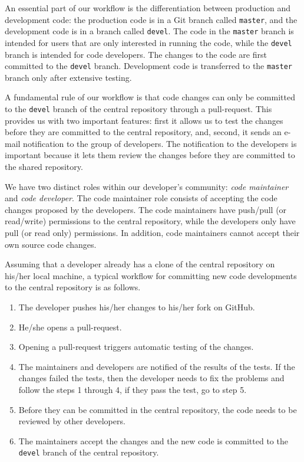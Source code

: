 An essential part of our workflow is the differentiation between production and
development code: the production code is in a Git branch called
\texttt{master}, and the
development code is in a branch called \texttt{devel}.
The code in the \texttt{master} branch is intended for users that are only
interested in
running the code, while the \texttt{devel} branch is intended for code
developers. The changes to the code are first committed to the \texttt{devel}
branch.
Development code is transferred to the \texttt{master} branch only after
extensive
testing.

A fundamental rule of our workflow is that code changes can only be
committed to the \texttt{devel} branch of the central repository through a
pull-request. This provides us with two important features: first it allows us
to test the changes before they are committed to the central
repository, and, second, it sends an e-mail notification to the group of
developers. The notification to the developers is important because  it lets
them  review the changes before they are committed to the shared repository.

We have two distinct roles within our developer's community: \emph{code
maintainer}
and \emph{code developer}. The code maintainer role consists of accepting the
code changes proposed by the developers. The code maintainers have push/pull
(or read/write) permissions to the central repository, while the developers
only
have pull (or read only) permissions. In addition, code maintainers cannot
accept their
own source code changes.

Assuming that a developer already has a clone of the central repository on
his/her local machine, a typical workflow for committing new code developments
to the central repository is as follows.
\begin{enumerate}
\item The developer pushes his/her changes to his/her fork on GitHub.
\item He/she opens a pull-request.
\item Opening a pull-request triggers automatic testing of the changes.
\item The maintainers and developers are notified of the results of the tests.
If the changes failed the tests, then the developer needs to fix the problems
and follow the steps 1 through 4, if they pass the test, go to step 5.
\item Before they can be committed in the central repository, the code needs to
be
reviewed by other developers.
\item The maintainers accept the changes and the new code is committed to the
  \texttt{devel} branch of the central repository.
\end{enumerate}

